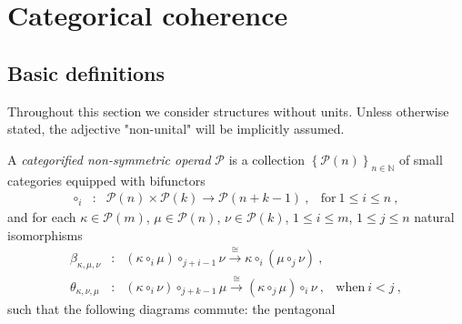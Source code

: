 
\section{Categorical coherence} 
\label{s:catoperads}
 
\subsection{Basic definitions}

Throughout this section we consider structures without units.
Unless otherwise stated, the adjective "non-unital" will be implicitly assumed. 

\begin{definition} 
\label{def:catoperad}
A \emph{categorified non-symmetric operad} $\mathcal{P}$ is a collection $\left\{  \mathcal{P}(n)  \right\}_{n\in \mathbb{N}}$ of small categories equipped with bifunctors  
$$ \begin{array}{clll}
\circ_i&\colon& \mathcal{P}(n) \times
                    \mathcal{P}(k)
                    \longrightarrow \mathcal{P}(n+k-1) \ ,
                    & \text{for}\ 1 \leq i \leq n \ ,
\end{array}  $$
and for each $\kappa \in \mathcal{P}(m)$,  $\mu \in \mathcal{P}(n)$, $\nu \in \mathcal{P}(k)$, $1 \leq i \leq m$, $1 \leq j \leq n$ natural isomorphisms 
$$ \begin{array}{clll}
    \beta_{\kappa,\mu,\nu}&\colon& 
    (\kappa \circ_i \mu) \circ_{j+i-1} \nu  \overset{\cong}{\longrightarrow} \kappa \circ_i (\mu \circ_j \nu) \ , &  \\
    \theta_{\kappa,\nu,\mu}&\colon& 
    (\kappa \circ_i \nu) \circ_{j+k-1} \mu 
    \overset{\cong}{\longrightarrow} (\kappa \circ_j \mu) \circ_i \nu \ , & \text{when}\ i < j \ , 
\end{array}  $$
such that the following diagrams commute: the pentagonal \\
\end{definition}

